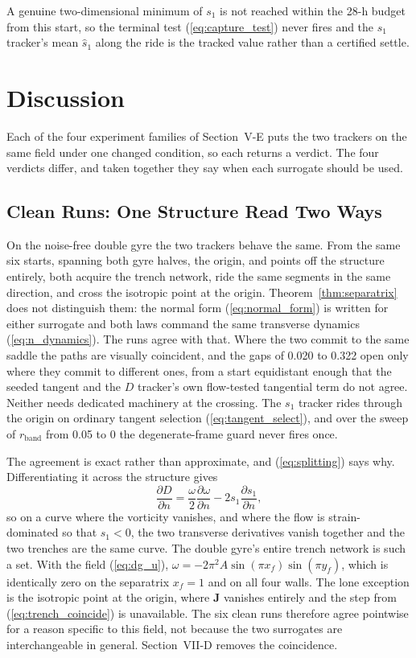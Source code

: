 \documentclass[lettersize,journal]{IEEEtran}
\begin{document}
A genuine two-dimensional minimum of $s_1$ is not reached within
the 28-h budget from this start, so the terminal test
(\ref{eq:capture_test}) never fires and the $s_1$ tracker's mean
$\hat{s}_1$ along the ride is the tracked value rather than a certified
settle.

\section{Discussion}
\label{sec:discussion}

Each of the four experiment families of Section~\mbox{V-E} puts the two
trackers on the same field under one changed condition, so each returns
a verdict. The four verdicts differ, and taken together they say when
each surrogate should be used.

\subsection{Clean Runs: One Structure Read Two Ways}
\label{sec:disc_clean}

On the noise-free double gyre the two trackers behave the same. From
the same six starts, spanning both gyre halves, the origin, and points
off the structure entirely, both acquire the trench network, ride the
same segments in the same direction, and cross the isotropic point at
the origin. Theorem~\ref{thm:separatrix} does not distinguish them: the
normal form (\ref{eq:normal_form}) is written for either surrogate and
both laws command the same transverse dynamics (\ref{eq:n_dynamics}).
The runs agree with that. Where the two commit to the same saddle the
paths are visually coincident, and the gaps of 0.020 to 0.322 open only
where they commit to different ones, from a start equidistant enough
that the seeded tangent and the $D$ tracker's own flow-tested
tangential term do not agree. Neither needs dedicated machinery at the
crossing. The $s_1$ tracker rides through the origin on ordinary
tangent selection (\ref{eq:tangent_select}), and over the sweep of
$r_{\text{band}}$ from 0.05 to 0 the degenerate-frame guard never fires
once.

The agreement is exact rather than approximate, and (\ref{eq:splitting})
says why. Differentiating it across the structure gives
\begin{equation}
    \frac{\partial D}{\partial n} =
    \frac{\omega}{2}\frac{\partial \omega}{\partial n}
    - 2 s_1 \frac{\partial s_1}{\partial n},
    \label{eq:trench_coincide}
\end{equation}
so on a curve where the vorticity vanishes, and where the flow is
strain-dominated so that $s_1 < 0$, the two transverse derivatives
vanish together and the two trenches are the same curve. The double
gyre's entire trench network is such a set. With the field
(\ref{eq:dg_u}), $\omega = -2\pi^2 A \sin(\pi x_f)\sin(\pi y_f)$, which
is identically zero on the separatrix $x_f = 1$ and on all four walls.
The lone exception is the isotropic point at the origin, where
$\mathbf{J}$ vanishes entirely and the step from
(\ref{eq:trench_coincide}) is unavailable.
The six clean runs therefore agree pointwise for a reason specific to
this field, not because the two surrogates are interchangeable in
general. Section~\mbox{VII-D} removes the coincidence.
\end{document}

